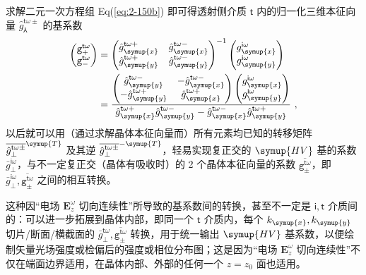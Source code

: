 求解二元一次方程组 Eq(\ref{eq:2-150b}) 即可得透射侧介质 $\mathsf{t}$ 内的归一化三维本征向量 $\hat{g}^{\mathsf{t}\omega\pm}_{\Yup}$ 的基系数
\begin{subequations} \label{eq:2-152}
	\abovedisplayskip=8pt
	\belowdisplayskip=10pt
	\begin{align}
		\begin{pmatrix} {\mathtt{g}}^{\mathsf{t}\omega}_{+} \\ 	{\mathtt{g}}^{\mathsf{t}\omega}_{-} \end{pmatrix} &= \begin{pmatrix} \hat{g}^{\mathsf{t}\omega+}_{\symup{x}} & \hat{g}^{\mathsf{t}\omega-}_{\symup{x}} \\ \hat{g}^{\mathsf{t}\omega+}_{\symup{y}} & \hat{g}^{\mathsf{t}\omega-}_{\symup{y}} \end{pmatrix}^{-1} \begin{pmatrix} g^{\mathsf{i}\omega}_{\symup{x}} \\ g^{\mathsf{i}\omega}_{\symup{y}} \end{pmatrix} \label{eq:2-152a}\\ &= \frac{ \begin{pmatrix} \hat{g}^{\mathsf{t}\omega-}_{\symup{y}} & -\hat{g}^{\mathsf{t}\omega-}_{\symup{x}} \\ -\hat{g}^{\mathsf{t}\omega+}_{\symup{y}} & \hat{g}^{\mathsf{t}\omega+}_{\symup{x}} \end{pmatrix} \begin{pmatrix} g^{\mathsf{i}\omega}_{\symup{x}} \\ g^{\mathsf{i}\omega}_{\symup{y}} \end{pmatrix} }{\hat{g}^{\mathsf{t}\omega+}_{\symup{x}} \hat{g}^{\mathsf{t}\omega-}_{\symup{y}} - \hat{g}^{\mathsf{t}\omega-}_{\symup{x}} \hat{g}^{\mathsf{t}\omega+}_{\symup{y}}} \label{eq:2-152b}~,
	\end{align}
\end{subequations}
以后就可以用（通过求解晶体本征向量而）所有元素均已知的转移矩阵 $\overline{\hat{g}^{\mathsf{t}\omega\pm}_{\perp}}^{\symup{T}}$ 及其逆 $\overline{\hat{g}^{\mathsf{t}\omega\pm}_{\perp}}^{-\symup{T}}$，轻易实现复正交的 $\symup{HV}$ 基的系数 $\bar{g}^{\mathsf{i}\omega}_{\perp}$，与不一定复正交（晶体有吸收时）的 2 个晶体本征向量的系数 $\overline{{\mathtt{g}}^{\mathsf{t}\omega}_{\pm}}$，即 $\bar{g}^{\mathsf{i}\omega}_{\perp}, \overline{{\mathtt{g}}^{\mathsf{t}\omega}_{\pm}}$ 之间的相互转换。

这种因“电场 $\symbf E^{\omega}_z$ 切向连续性”所导致的基系数间的转换，甚至不一定是 $\mathsf{i}, \mathsf{t}$ 介质间的：可以进一步拓展到晶体内部，即同一个 $\mathsf{t}$ 介质内，每个 $k_{\symup{x}}, k_{\symup{y}}$ 切片/断面/横截面的 $\bar{g}^{\mathsf{t}\omega}_{\perp}, \overline{{\mathtt{g}}^{\mathsf{t}\omega}_{\pm}}$ 转换，用于统一输出 $\symup{HV}$ 基系数，以便绘制矢量光场强度或检偏后的强度或相位分布图；这是因为“电场 $\symbf E^{\omega}_z$ 切向连续性”不仅在端面边界适用，在晶体内部、外部的任何一个 $z=z_0$ 面也适用。

